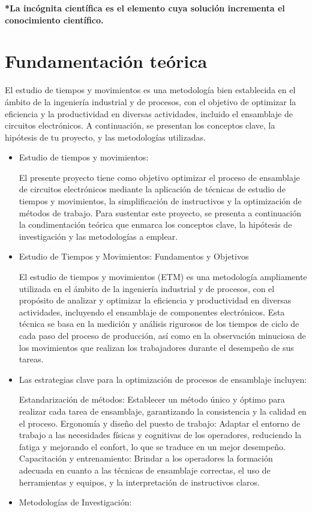     \textbf{*La incógnita científica es el elemento cuya solución incrementa el conocimiento científico.}
    \section{Fundamentación teórica}
    
    El estudio de tiempos y movimientos es una metodología bien establecida en el ámbito de la ingeniería industrial y de procesos, con el objetivo de optimizar la eficiencia y la productividad en diversas actividades, incluido el ensamblaje de circuitos electrónicos. A continuación, se presentan los conceptos clave, la hipótesis de tu proyecto, y las metodologías utilizadas.
    \begin{itemize}
        \item Estudio de tiempos y movimientos:
    
    El presente proyecto tiene como objetivo optimizar el proceso de ensamblaje de circuitos electrónicos mediante la aplicación de técnicas de estudio de tiempos y movimientos, la simplificación de instructivos y la optimización de métodos de trabajo. Para sustentar este proyecto, se presenta a continuación la condimentación teórica que enmarca los conceptos clave, la hipótesis de investigación y las metodologías a emplear.
        \item Estudio de Tiempos y Movimientos: Fundamentos y Objetivos
    
    El estudio de tiempos y movimientos (ETM) es una metodología ampliamente utilizada en el ámbito de la ingeniería industrial y de procesos, con el propósito de analizar y optimizar la eficiencia y productividad en diversas actividades, incluyendo el ensamblaje de componentes electrónicos. Esta técnica se basa en la medición y análisis rigurosos de los tiempos de ciclo de cada paso del proceso de producción, así como en la observación minuciosa de los movimientos que realizan los trabajadores durante el desempeño de sus tareas.
        \item Las estrategias clave para la optimización de procesos de ensamblaje incluyen:
    
    Estandarización de métodos: Establecer un método único y óptimo para realizar cada tarea de ensamblaje, garantizando la consistencia y la calidad en el proceso.
    Ergonomía y diseño del puesto de trabajo: Adaptar el entorno de trabajo a las necesidades físicas y cognitivas de los operadores, reduciendo la fatiga y mejorando el confort, lo que se traduce en un mejor desempeño.
    Capacitación y entrenamiento: Brindar a los operadores la formación adecuada en cuanto a las técnicas de ensamblaje correctas, el uso de herramientas y equipos, y la interpretación de instructivos claros.
        \item Metodologías de Investigación:
    

\end{itemize}
